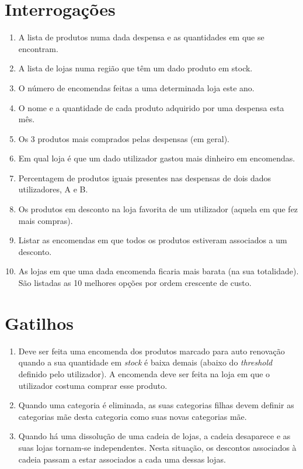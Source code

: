\documentclass{report}
\begin{document}
\chapter{Interrogações}
  \begin{enumerate}
    \item A lista de produtos numa dada despensa e as quantidades em que se
      encontram.
    \item A lista de lojas numa região que têm um dado produto em stock.
    \item O número de encomendas feitas a uma determinada loja este ano.
    \item O nome e a quantidade de cada produto adquirido por uma despensa esta
      mês.
    \item Os 3 produtos mais comprados pelas despensas (em geral).
    \item Em qual loja é que um dado utilizador gastou mais dinheiro em encomendas.
    \item Percentagem de produtos iguais presentes nas despensas de dois dados
      utilizadores, A e B.
    \item Os produtos em desconto na loja favorita de um utilizador (aquela em
      que fez mais compras).
    \item Listar as encomendas em que todos os produtos estiveram associados a
      um desconto.
    \item As lojas em que uma dada encomenda ficaria mais barata (na sua
      totalidade). São listadas as 10 melhores opções por ordem crescente de custo.
  \end{enumerate}

\chapter{Gatilhos}
  \begin{enumerate}
    \item Deve ser feita uma encomenda dos produtos marcado para auto renovação
      quando a sua quantidade em \textit{stock} é baixa demais (abaixo do
      \textit{threshold} definido pelo utilizador). A encomenda deve ser feita
      na loja em que o utilizador costuma comprar esse produto.
    \item Quando uma categoria é eliminada, as suas categorias filhas devem
      definir as categorias mãe desta categoria como suas novas categorias
      mãe.
    \item Quando há uma dissolução de uma cadeia de lojas, a cadeia desaparece
      e as suas lojas tornam-se independentes. Nesta situação, os descontos
      associados à cadeia passam a estar associados a cada uma dessas lojas.
  \end{enumerate}
\end{document}
